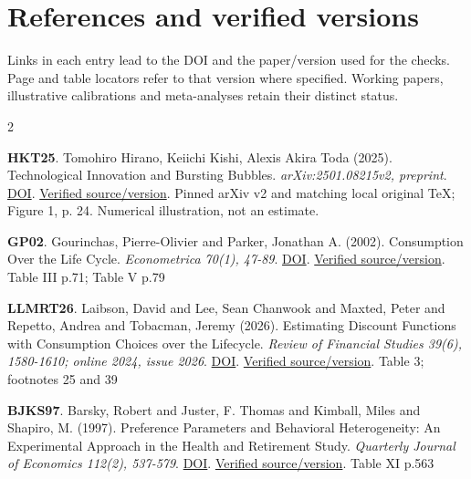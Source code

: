 \documentclass[10pt,a4paper,landscape]{article}
\begin{document}
\section{References and verified versions}
Links in each entry lead to the DOI and the paper/version used for the checks. Page and table locators refer to that version where specified. Working papers, illustrative calibrations and meta-analyses retain their distinct status.
\begin{multicols}{2}\fontsize{9.2}{10.8}\selectfont\setlength{\parskip}{7pt}
\begin{minipage}{\linewidth}\hypertarget{ref:HKT25}{}\textbf{HKT25}. Tomohiro Hirano, Keiichi Kishi, Alexis Akira Toda (2025). Technological Innovation and Bursting Bubbles. \emph{arXiv:2501.08215v2, preprint}. \href{https://doi.org/10.48550/arXiv.2501.08215}{DOI}. \href{https://arxiv.org/html/2501.08215v2}{Verified source/version}. Pinned arXiv v2 and matching local original TeX; Figure 1, p. 24. Numerical illustration, not an estimate.\end{minipage}\par
\begin{minipage}{\linewidth}\hypertarget{ref:GP02}{}\textbf{GP02}. Gourinchas, Pierre-Olivier and Parker, Jonathan A. (2002). Consumption Over the Life Cycle. \emph{Econometrica 70(1), 47-89}. \href{https://doi.org/10.1111/1468-0262.00269}{DOI}. \href{https://jggarita.github.io/MacroIntermedia/materials/Readings/GourinchasParker2002.pdf}{Verified source/version}. Table III p.71; Table V p.79\end{minipage}\par
\begin{minipage}{\linewidth}\hypertarget{ref:LLMRT26}{}\textbf{LLMRT26}. Laibson, David and Lee, Sean Chanwook and Maxted, Peter and Repetto, Andrea and Tobacman, Jeremy (2026). Estimating Discount Functions with Consumption Choices over the Lifecycle. \emph{Review of Financial Studies 39(6), 1580-1610; online 2024, issue 2026}. \href{https://doi.org/10.1093/rfs/hhae035}{DOI}. \href{https://academic.oup.com/rfs/article/39/6/1580/7703274?rss=1}{Verified source/version}. Table 3; footnotes 25 and 39\end{minipage}\par
\begin{minipage}{\linewidth}\hypertarget{ref:BJKS97}{}\textbf{BJKS97}. Barsky, Robert and Juster, F. Thomas and Kimball, Miles and Shapiro, M. (1997). Preference Parameters and Behavioral Heterogeneity: An Experimental Approach in the Health and Retirement Study. \emph{Quarterly Journal of Economics 112(2), 537-579}. \href{https://doi.org/10.1162/003355397555280}{DOI}. \href{https://websites.umich.edu/~mkimball/keio/5.\%20papers/qje-bjks-risk-aversion.pdf}{Verified source/version}. Table XI p.563\end{minipage}\par

\end{multicols}
\end{document}
